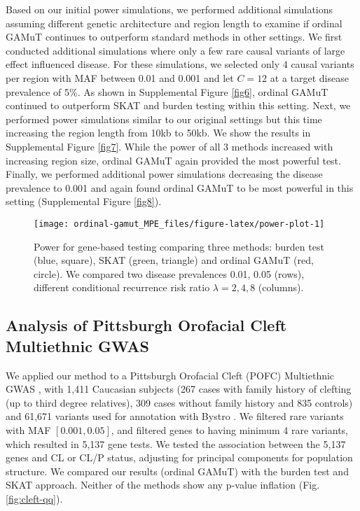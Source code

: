 \documentclass[]{article}
\begin{document}
Based on our initial power simulations, we performed additional simulations assuming different genetic architecture and region length to examine if ordinal GAMuT continues to outperform standard methods in other settings. We first conducted additional simulations where only a few rare causal variants of large effect influenced disease. For these simulations, we selected only 4 causal variants per region with MAF between 0.01 and 0.001 and let \(C=12\) at a target disease prevalence of 5\%. As shown in Supplemental Figure \ref{fig6}, ordinal GAMuT continued to outperform SKAT and burden testing within this setting. Next, we performed power simulations similar to our original settings but this time increasing the region length from 10kb to 50kb. We show the results in Supplemental Figure \ref{fig7}. While the power of all 3 methods increased with increasing region size, ordinal GAMuT again provided the most powerful test. Finally, we performed additional power simulations decreasing the disease prevalence to 0.001 and again found ordinal GAMuT to be most powerful in this setting (Supplemental Figure \ref{fig8}).

\begin{figure}

{\centering \texttt{[image: ordinal-gamut\_MPE\_files/figure-latex/power-plot-1]} 

}

\caption{Power for gene-based testing comparing three methods: burden test (blue, square), SKAT (green, triangle) and ordinal GAMuT (red, circle). We compared two disease prevalences 0.01, 0.05 (rows), different conditional recurrence risk ratio $\lambda=2,4,8$ (columns).}\label{fig:power-plot}
\end{figure}

\hypertarget{analysis-of-pittsburgh-orofacial-cleft-multiethnic-gwas-1}{%
\subsection{Analysis of Pittsburgh Orofacial Cleft Multiethnic GWAS}\label{analysis-of-pittsburgh-orofacial-cleft-multiethnic-gwas-1}}

We applied our method to a Pittsburgh Orofacial Cleft (POFC) Multiethnic GWAS \citep{Leslie2016}, \citep{Leslie2016b} with 1,411 Caucasian subjects (267 cases with family history of clefting (up to third degree relatives), 309 cases without family history and 835 controls) and 61,671 variants used for annotation with Bystro \citep{Kotlar2018}.
We filtered rare variants with MAF \([0.001,0.05]\), and filtered genes to having minimum 4 rare variants, which resulted in 5,137 gene tests.
We tested the association between the 5,137 genes and CL or CL/P status, adjusting for principal components for population structure. We compared our results (ordinal GAMuT) with the burden test and SKAT approach.
Neither of the methods show any p-value inflation (Fig. \ref{fig:cleft-qq}).
\end{document}
